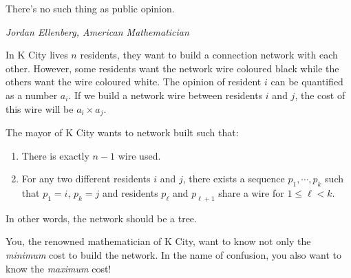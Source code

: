 \epigraph{There's no such thing as public opinion.}{\textit{Jordan Ellenberg, American Mathematician}}

In K City lives $n$ residents, they want to build a connection network with 
each other. However, some residents want the network wire coloured black while 
the others want the wire coloured white. The opinion of resident $i$ can be 
quantified as a number $a_i$. If we build a network wire between residents 
$i$ and $j$, the cost of this wire will be $a_i \times a_j$.

The mayor of K City wants to network built such that:

\begin{enumerate}
\tightlist
\item There is exactly $n - 1$ wire used.
\item For any two different residents $i$ and $j$, there exists a sequence 
$p_1, \cdots, p_k$ such that $p_1=i$, $p_k=j$ and residents $p_\ell$ and 
$p_{\ell+1}$ share a wire for $1\le \ell < k$.
\end{enumerate}

In other words, the network should be a tree.

You, the renowned mathematician of K City, want to know not only the 
\emph{minimum} 
cost to build the network. In the name of confusion, you also want to know the
\emph{maximum} cost!
